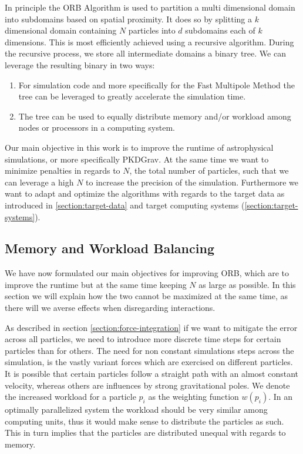 \documentclass[]{article}
\begin{document}
In principle the ORB Algorithm is used to partition a multi dimensional domain into subdomains based on spatial proximity. It does so by splitting a $k$ dimensional domain containing $N$ particles into $d$  subdomains each of $k$ dimensions. This is most efficiently achieved using a recursive algorithm. During the recursive process, we store all intermediate domains a binary tree. We can leverage the resulting binary in two ways:

\begin{enumerate}
	\item For simulation code and more specifically for the Fast Multipole Method the tree can be leveraged to greatly accelerate the simulation time. 
	\item The tree can be used to equally distribute memory and/or workload among nodes or processors in a computing system. 
\end{enumerate} 

Our main objective in this work is to improve the runtime of astrophysical simulations, or more specifically PKDGrav. At the same time we want to minimize penalties in regards to $N$, the total number of particles, such that we can leverage a high $N$ to increase the precision of the simulation. Furthermore we want to adapt and optimize the algorithms with regards to the target data as introduced in \ref{section:target-data} and target computing systems (\ref{section:target-systems}).

\subsection{Memory and Workload Balancing}\label{sec:balancing}
We have now formulated our main objectives for improving ORB, which are to improve the runtime but at the same time keeping $N$ as large as possible. In this section we will explain how the two cannot be maximized at the same time, as there will we averse effects when disregarding interactions. 

As described in section \ref{section:force-integration} if we want to mitigate the error across all particles, we need to introduce more discrete time steps for certain particles than for others. The need for non constant simulations steps across the simulation, is the vastly variant forces which are exercised on different particles. It is possible that certain particles follow a straight path with an almost constant velocity, whereas others are influences by strong gravitational poles. We denote the increased workload for a particle $p_i$ as the weighting function $w(p_i)$. In an optimally parallelized system the workload should be very similar among computing units, thus it would make sense to distribute the particles as such. This in turn implies that the particles are distributed unequal with regards to memory.  
\end{document}
